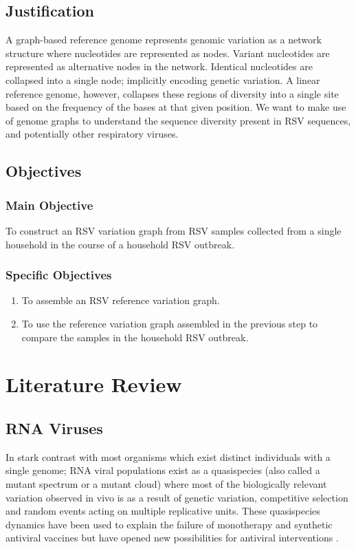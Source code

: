 \documentclass[10pt, a4paper]{article}
\begin{document}
\subsection{Justification}
\label{sec:orgd000750}
A graph-based reference genome represents genomic variation as a network
structure where nucleotides are represented as nodes.
Variant nucleotides are represented as alternative nodes in the network.
Identical nucleotides are collapsed into a single node; implicitly encoding
genetic variation.
A linear reference genome, however, collapses these regions of diversity into a
single site based on the frequency of the bases at that given position.
We want to make use of genome graphs to understand the sequence diversity
present in RSV sequences, and potentially other respiratory viruses.

\newpage
\subsection{Objectives}
\label{sec:orgba1569f}
\subsubsection{Main Objective}
\label{sec:org0e54bb4}
To construct an RSV variation graph from RSV samples collected from a single
household in the course of a household RSV outbreak.

\subsubsection{Specific Objectives}
\label{sec:orga365b2c}
\begin{enumerate}
\item To assemble an RSV reference variation graph.
\item To use the reference variation graph assembled in the previous step to
compare the samples in the household RSV outbreak.
\end{enumerate}
\newpage
\section{Literature Review}
\label{sec:orgdd01da4}
\subsection{RNA Viruses}
\label{sec:org1ca6d7b}
In stark contrast with most organisms which exist distinct individuals with a
single genome; RNA viral populations exist as a quasispecies (also called a
mutant spectrum or a mutant cloud) where most of the biologically relevant
variation observed in vivo is as a result of genetic variation, competitive
selection and random events acting on multiple replicative units.
These quasispecies dynamics have been used to explain the failure of monotherapy
and synthetic antiviral vaccines but have opened new possibilities for antiviral
interventions \cite{domingoViralQuasispeciesEvolution2012}.
\end{document}
